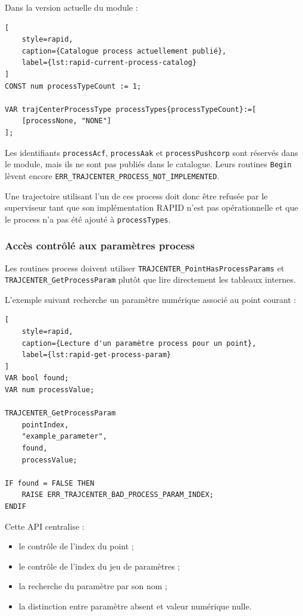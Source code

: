 \documentclass{rapportENSAM}
\begin{document}
Dans la version actuelle du module :

\begin{lstlisting}[
    style=rapid,
    caption={Catalogue process actuellement publié},
    label={lst:rapid-current-process-catalog}
]
CONST num processTypeCount := 1;

VAR trajCenterProcessType processTypes{processTypeCount}:=[
    [processNone, "NONE"]
];
\end{lstlisting}

Les identifiants \texttt{processAcf}, \texttt{processAak} et
\texttt{processPushcorp} sont réservés dans le module, mais ils ne sont pas
publiés dans le catalogue. Leurs routines \texttt{Begin} lèvent encore
\texttt{ERR\_TRAJCENTER\_PROCESS\_NOT\_IMPLEMENTED}.

Une trajectoire utilisant l'un de ces process doit donc être refusée par le
superviseur tant que son implémentation RAPID n'est pas opérationnelle et que
le process n'a pas été ajouté à \texttt{processTypes}.


\subsubsection{Accès contrôlé aux paramètres process}
\label{subsubsec:technic-process-parameter-access}

Les routines process doivent utiliser \texttt{TRAJCENTER\_PointHasProcessParams} et \texttt{TRAJCENTER\_GetProcessParam} plutôt que lire directement les tableaux internes.

L'exemple suivant recherche un paramètre numérique associé au point courant :

\begin{lstlisting}[
    style=rapid,
    caption={Lecture d'un paramètre process pour un point},
    label={lst:rapid-get-process-param}
]
VAR bool found;
VAR num processValue;

TRAJCENTER_GetProcessParam
    pointIndex,
    "example_parameter",
    found,
    processValue;

IF found = FALSE THEN
    RAISE ERR_TRAJCENTER_BAD_PROCESS_PARAM_INDEX;
ENDIF
\end{lstlisting}

Cette API centralise :

\begin{itemize}
    \item le contrôle de l'index du point ;
    \item le contrôle de l'index du jeu de paramètres ;
    \item la recherche du paramètre par son nom ;
    \item la distinction entre paramètre absent et valeur numérique nulle.
\end{itemize}
\end{document}
